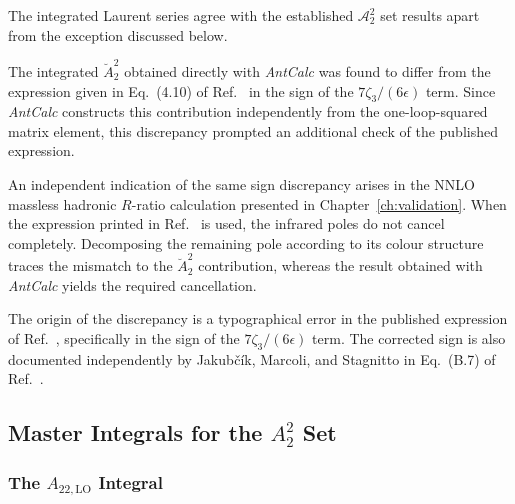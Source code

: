 The integrated Laurent series agree with the established $\mathcal A_2^2$ set results
\cite{Gehrmann-DeRidder:2004ttg} apart from the exception discussed below.

The integrated $\breve A_2^2$ obtained directly with \textit{AntCalc} was found to differ from the
expression given in Eq.~(4.10) of Ref.~\cite{Gehrmann-DeRidder:2004ttg} in the sign of the
$7\zeta_3/(6\epsilon)$ term. Since \textit{AntCalc} constructs this contribution independently from the
one-loop-squared matrix element, this discrepancy prompted an additional check of the published
expression.

An independent indication of the same sign discrepancy arises in the NNLO massless hadronic
$R$-ratio calculation presented in Chapter~\ref{ch:validation}. When the expression printed in
Ref.~\cite{Gehrmann-DeRidder:2004ttg} is used, the infrared poles do not cancel completely.
Decomposing the remaining pole according to its colour structure traces the mismatch to the
$\breve A_2^2$ contribution, whereas the result obtained with \textit{AntCalc} yields the required
cancellation.

The origin of the discrepancy is a typographical error in the published expression of
Ref.~\cite{Gehrmann-DeRidder:2004ttg}, specifically in the sign of the $7\zeta_3/(6\epsilon)$ term.
The corrected sign is also documented independently by Jakubčík, Marcoli, and Stagnitto in
Eq.~(B.7) of Ref.~\cite{Jakubcik:2022zdi}.


\subsection{Master Integrals for the $A_2^2$ Set}\label{subsec:A22mi}

\subsubsection*{The $A_{22,\text{LO}}$ Integral}

